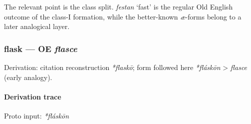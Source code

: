 \documentclass[
  british,
  a4paper,
]{article}
\begin{document}
The relevant point is the class split. {\emph{festan}} `fast' is the
regular Old English outcome of the class-I formation, while the
better-known \emph{æ}-forms belong to a later analogical layer.

\subsubsection{\texorpdfstring{flask --- OE
\emph{flasce}}{flask --- OE flasce}}\label{flask-oe-flasce}

Derivation: citation reconstruction \emph{*flaskō}; form followed here
\emph{*fláskōn} \textgreater{} \emph{flasce} (early analogy).

\paragraph{Derivation trace}\label{derivation-trace-92}

Proto input: \emph{*fláskōn}

\begingroup
\setlength{\fboxsep}{6pt}
\end{document}
